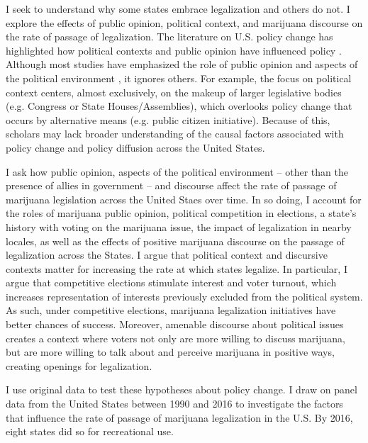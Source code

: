 I seek to understand why some states embrace legalization and others do not. I explore the effects of public opinion, political context, and marijuana discourse on the rate of passage of legalization. The literature on U.S. policy change has highlighted how political contexts and public opinion have influenced policy \citep{burstein_and_linton_2002,amenta_et_al_2001,amenta_and_elliott_2019}. Although most studies have emphasized the role of public opinion and aspects of the political environment  \citep{burstein_and_linton_2002}, it ignores others. For example, the focus on political context centers, almost exclusively, on the makeup of larger legislative bodies (e.g. Congress or State Houses/Assemblies), which overlooks policy change that occurs by alternative means (e.g. public citizen initiative). Because of this, scholars may lack broader understanding of the causal factors associated with policy change and policy diffusion across the United States. 

I ask how public opinion, aspects of the political environment -- other than the presence of allies in government -- and discourse affect the rate of passage of marijuana legislation across the United Staes over time. In so doing, I account for the roles of marijuana public opinion, political competition in elections, a state's history with voting on the marijuana issue, the impact of legalization in nearby locales, as well as the effects of positive marijuana discourse on the passage of legalization across the States. I argue that political context and discursive contexts matter for increasing the rate at which states legalize. In particular, I argue that competitive elections stimulate interest and voter turnout, which increases representation of interests previously excluded from the political system. As such, under competitive elections, marijuana legalization initiatives have better chances of success. Moreover, amenable discourse about political issues creates a context where voters not only are more willing to discuss marijuana, but are more willing to talk about and perceive marijuana in positive ways, creating openings for legalization. 



I use original data to test these hypotheses about policy change. I draw on panel data from the United States between 1990 and 2016 to investigate the factors that influence the rate of passage of marijuana legalization in the U.S. By 2016, eight states did so for recreational use. %



